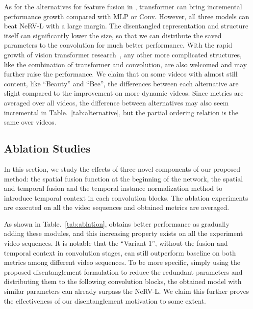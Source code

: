 \documentclass[runningheads]{llncs}
\begin{document}
As for the alternatives for feature fusion in , transformer can bring incremental performance growth compared with MLP or Conv. However, all three models can beat NeRV-L with a large margin. The disentangled representation and structure itself can significantly lower the size, so that we can distribute the saved parameters to the convolution for much better performance. With the rapid growth of vision transformer research~\cite{han2020survey}, any other more complicated structures, like the combination of transformer and convolution, are also welcomed and may further raise the performance. We claim that on some videos with almost still content, like ``Beauty'' and ``Bee'', the differences between each alternative are slight compared to the improvement on more dynamic videos. Since metrics are averaged over all videos, the difference between alternatives may also seem incremental in Table.~\ref{tab:alternative}, but the partial ordering relation is the same over  videos.


\subsection{Ablation Studies}
\label{ablation}

In this section, we study the effects of three novel components of our proposed method: the spatial fusion function  at the beginning of the network, the spatial and temporal fusion  and the temporal instance normalization method to introduce temporal context in each convolution blocks. The ablation experiments are executed on all the video sequences and obtained metrics are averaged.

As shown in Table.~\ref{tab:ablation}, \netname obtains better performance as gradually adding these modules, and this increasing property exists on all the experiment video sequences. It is notable that the ``Variant 1'', without the fusion and temporal context in convolution stages, can still outperform baseline on both metrics among different video sequences. To be more specific, simply using the proposed disentanglement formulation to reduce the redundant parameters and distributing them to the following convolution blocks, the obtained model with similar parameters can already surpass the NeRV-L. We claim this further proves the effectiveness of our disentanglement motivation to some extent.
\end{document}
